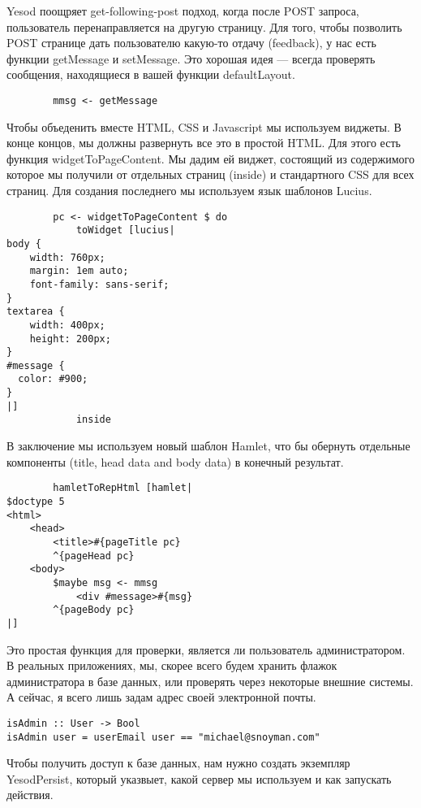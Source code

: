 Yesod поощряет get-following-post подход, когда после POST запроса, пользователь перенаправляется на другую страницу. Для того, чтобы позволить POST странице дать пользователю какую-то отдачу (feedback), у нас есть функции getMessage и setMessage. Это хорошая идея --- всегда проверять сообщения, находящиеся в вашей функции defaultLayout. 
 
\begin{lstlisting}
        mmsg <- getMessage
\end{lstlisting}
 
Чтобы объеденить вместе HTML, CSS и Javascript мы используем виджеты. В конце концов, мы должны развернуть все это в простой HTML. Для этого есть функция widgetToPageContent. Мы дадим ей виджет, состоящий из содержимого которое мы получили от отдельных страниц (inside) и стандартного CSS для всех страниц. Для создания последнего мы используем язык шаблонов Lucius. 
 
\begin{lstlisting}
        pc <- widgetToPageContent $ do
            toWidget [lucius|
body {
    width: 760px;
    margin: 1em auto;
    font-family: sans-serif;
}
textarea {
    width: 400px;
    height: 200px;
}
#message {
  color: #900;
}
|]
            inside
\end{lstlisting}
 
В заключение мы используем новый шаблон Hamlet, что бы обернуть отдельные компоненты (title, head data and body data) в конечный результат. 
 
\begin{lstlisting}
        hamletToRepHtml [hamlet|
$doctype 5
<html>
    <head>
        <title>#{pageTitle pc}
        ^{pageHead pc}
    <body>
        $maybe msg <- mmsg
            <div #message>#{msg}
        ^{pageBody pc}
|]
\end{lstlisting}
 
Это простая функция для проверки, является ли пользователь администратором. В реальных приложениях, мы, скорее всего будем хранить флажок администратора в базе данных, или проверять через некоторые внешние системы. А сейчас, я всего лишь задам адрес своей электронной почты. 
 
\begin{lstlisting}
isAdmin :: User -> Bool
isAdmin user = userEmail user == "michael@snoyman.com"
\end{lstlisting}
 
Чтобы получить доступ к базе данных, нам нужно создать экземпляр YesodPersist, который указвыет, какой сервер мы используем и как запускать действия. 
 
